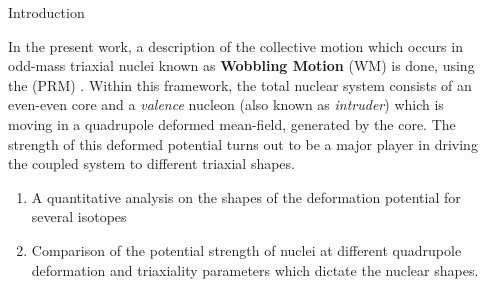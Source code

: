 \documentclass[final]{beamer}
\newlength{\sepwidth}
\newlength{\colwidth}
\newcommand{\separatorcolumn}{\begin{column}{\sepwidth}\end{column}}
\begin{document}
\begin{frame}[t]
\begin{columns}[t]
\separatorcolumn

\begin{column}{\colwidth}

  \begin{block}{Introduction}


In the present work, a description of the collective motion which occurs in odd-mass triaxial nuclei known as \textbf{Wobbling Motion} (WM) is done, using the  (PRM) \cite{bohr1998nuclear}. Within this framework, the total nuclear system consists of an even-even core and a \emph{valence} nucleon (also known as \emph{intruder}) which is moving in a quadrupole deformed mean-field, generated by the core. The strength of this deformed potential turns out to be a major player in driving the coupled system to different triaxial shapes.


\begin{enumerate}
    \item A quantitative analysis on the shapes of the deformation potential for several isotopes
    \item Comparison of the potential strength of nuclei at different quadrupole deformation and triaxiality parameters which dictate the nuclear shapes.
\end{enumerate}


  \end{block}


\end{column}
\end{columns}
\end{frame}
\end{document}
